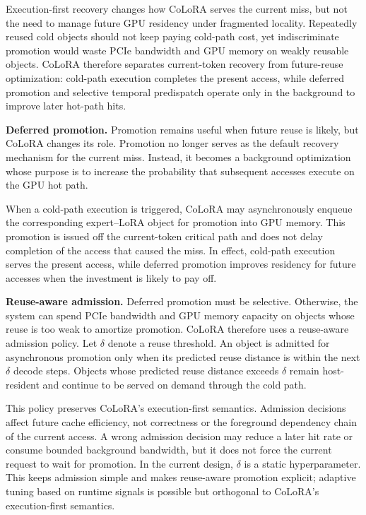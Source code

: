 \documentclass[sigplan,anonymous,review,10pt]{acmart}
\begin{document}
Execution-first recovery changes how CoLoRA serves the current miss, but not the need to manage future GPU residency under fragmented locality. Repeatedly reused cold objects should not keep paying cold-path cost, yet indiscriminate promotion would waste PCIe bandwidth and GPU memory on weakly reusable objects. CoLoRA therefore separates current-token recovery from future-reuse optimization: cold-path execution completes the present access, while deferred promotion and selective temporal predispatch operate only in the background to improve later hot-path hits.

\noindent\textbf{Deferred promotion.}
Promotion remains useful when future reuse is likely, but CoLoRA changes its role. Promotion no longer serves as the default recovery mechanism for the current miss. Instead, it becomes a background optimization whose purpose is to increase the probability that subsequent accesses execute on the GPU hot path.

When a cold-path execution is triggered, CoLoRA may asynchronously enqueue the corresponding expert--LoRA object for promotion into GPU memory. This promotion is issued off the current-token critical path and does not delay completion of the access that caused the miss. In effect, cold-path execution serves the present access, while deferred promotion improves residency for future accesses when the investment is likely to pay off.

\noindent\textbf{Reuse-aware admission.}
Deferred promotion must be selective. Otherwise, the system can spend PCIe bandwidth and GPU memory capacity on objects whose reuse is too weak to amortize promotion. CoLoRA therefore uses a reuse-aware admission policy. Let $\delta$ denote a reuse threshold. An object is admitted for asynchronous promotion only when its predicted reuse distance is within the next $\delta$ decode steps. Objects whose predicted reuse distance exceeds $\delta$ remain host-resident and continue to be served on demand through the cold path.

This policy preserves CoLoRA's execution-first semantics. Admission decisions affect future cache efficiency, not correctness or the foreground dependency chain of the current access. A wrong admission decision may reduce a later hit rate or consume bounded background bandwidth, but it does not force the current request to wait for promotion. In the current design, $\delta$ is a static hyperparameter. This keeps admission simple and makes reuse-aware promotion explicit; adaptive tuning based on runtime signals is possible but orthogonal to CoLoRA’s execution-first semantics.
\end{document}
